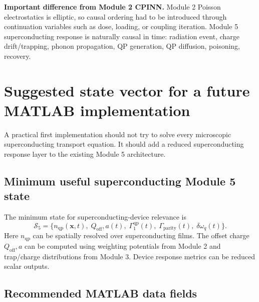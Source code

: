\documentclass[11pt]{article}
\newcommand{\x}{\bm{x}}
\newcommand{\nqp}{n_{\mathrm{qp}}}
\newcommand{\Qoff}{Q_{\mathrm{off}}}
\begin{document}
\begin{physicsbox}
\textbf{Important difference from Module 2 CPINN.} Module 2 Poisson electrostatics is elliptic, so causal ordering had to be introduced through continuation variables such as dose, loading, or coupling iteration. Module 5 superconducting response is naturally causal in time: radiation event, charge drift/trapping, phonon propagation, QP generation, QP diffusion, poisoning, recovery.
\end{physicsbox}

\section{Suggested state vector for a future MATLAB implementation}

A practical first implementation should not try to solve every microscopic superconducting transport equation. It should add a reduced superconducting response layer to the existing Module 5 architecture.

\subsection{Minimum useful superconducting Module 5 state}

The minimum state for superconducting-device relevance is
\begin{equation}
\boxed{\mathcal{S}_5=\{\nqp(\x,t),\;\Qoff,a(t),\;\Gamma_1^{\mathrm{qp}}(t),\;\Gamma_{\mathrm{parity}}(t),\;\delta\omega_q(t)\}.}
\end{equation}
Here \(\nqp\) can be spatially resolved over superconducting films. The offset charge \(\Qoff,a\) can be computed using weighting potentials from Module 2 and trap/charge distributions from Module 3. Device response metrics can be reduced scalar outputs.

\subsection{Recommended MATLAB data fields}
\end{document}
